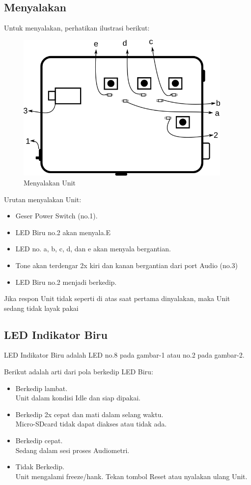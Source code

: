 \documentclass[12pt,]{article}
\begin{document}
	\subsection{Menyalakan}
	
	Untuk menyalakan, perhatikan ilustrasi berikut:
	
	\begin{figure}[!ht]
		\centering
		\includegraphics[width=300pt]{images/turnon}
		\caption{Menyalakan Unit}
	\end{figure}
	
	\newpage
	Urutan menyalakan Unit:
	\begin{itemize}
		\item Geser Power Switch (no.1).
		\item LED Biru no.2 akan menyala.E
		\item LED no. a, b, c, d, dan e akan menyala bergantian.
		\item Tone akan terdengar 2x kiri dan kanan bergantian dari port Audio (no.3)
		\item LED Biru no.2 menjadi berkedip.
	\end{itemize}

	Jika respon Unit tidak seperti di atas saat pertama dinyalakan, maka Unit sedang tidak layak pakai
	
	\subsection{LED Indikator Biru}
	
	LED Indikator Biru adalah LED no.8 pada gambar-1 atau no.2 pada gambar-2.
	
	Berikut adalah arti dari pola berkedip LED Biru:
	\begin{itemize}
		\item Berkedip lambat.\\
		Unit dalam kondisi Idle dan siap dipakai.
		
		\item Berkedip 2x cepat dan mati dalam selang waktu.\\
		Micro-SDcard tidak dapat diakses atau tidak ada.
		
		\item Berkedip cepat.\\
		Sedang dalam sesi proses Audiometri.
		
		\item Tidak Berkedip.\\
		Unit mengalami freeze/hank. Tekan tombol Reset atau nyalakan ulang Unit.
	\end{itemize}
	
\end{document}

